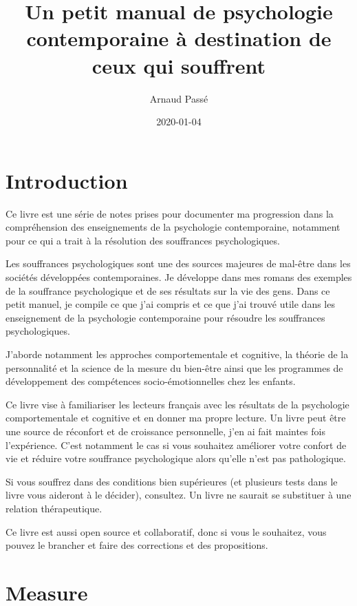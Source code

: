 \documentclass[]{book}
\title{Un petit manual de psychologie contemporaine à destination de ceux qui souffrent}
\author{Arnaud Passé}
\date{2020-01-04}
\begin{document}
\maketitle

{
\setcounter{tocdepth}{0}
\tableofcontents
}
\hypertarget{introduction}{%
\chapter*{Introduction}\label{introduction}}

Ce livre est une série de notes prises pour documenter ma progression dans la compréhension des enseignements de la psychologie contemporaine, notamment pour ce qui a trait à la résolution des souffrances psychologiques.

Les souffrances psychologiques sont une des sources majeures de mal-être dans les sociétés développées contemporaines.
Je développe dans mes romans des exemples de la souffrance psychologique et de ses résultats sur la vie des gens.
Dans ce petit manuel, je compile ce que j'ai compris et ce que j'ai trouvé utile dans les enseignement de la psychologie contemporaine pour résoudre les souffrances psychologiques.

J'aborde notamment les approches comportementale et cognitive, la théorie de la personnalité et la science de la mesure du bien-être ainsi que les programmes de développement des compétences socio-émotionnelles chez les enfants.

Ce livre vise à familiariser les lecteurs français avec les résultats de la psychologie comportementale et cognitive et en donner ma propre lecture.
Un livre peut être une source de réconfort et de croissance personnelle, j'en ai fait maintes fois l'expérience.
C'est notamment le cas si vous souhaitez améliorer votre confort de vie et réduire votre souffrance psychologique alors qu'elle n'est pas pathologique.

Si vous souffrez dans des conditions bien supérieures (et plusieurs tests dans le livre vous aideront à le décider), consultez.
Un livre ne saurait se substituer à une relation thérapeutique.

Ce livre est aussi open source et collaboratif, donc si vous le souhaitez, vous pouvez le brancher et faire des corrections et des propositions.

\hypertarget{measure}{%
\chapter{Measure}\label{measure}}
\end{document}
